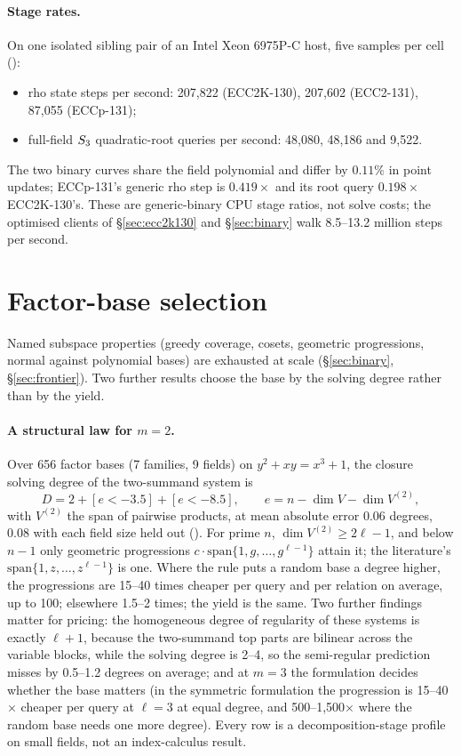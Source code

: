 \paragraph{Stage rates.} On one isolated sibling pair of an Intel Xeon
6975P-C host, five samples per cell
():
\begin{itemize}
\item rho state steps per second: 207{,}822 (ECC2K-130), 207{,}602
  (ECC2-131), 87{,}055 (ECCp-131);
\item full-field $S_{3}$ quadratic-root queries per second: 48{,}080,
  48{,}186 and 9{,}522.
\end{itemize}
The two binary curves share the field polynomial and differ by $0.11\%$ in
point updates; ECCp-131's generic rho step is $0.419\times$ and its root
query $0.198\times$ ECC2K-130's. These are generic-binary CPU stage ratios,
not solve costs; the optimised clients of \S\ref{sec:ecc2k130} and
\S\ref{sec:binary} walk 8.5--13.2 million steps per second.

\section{Factor-base selection}\label{sec:bt-fbselect}

Named subspace properties (greedy coverage, cosets, geometric progressions,
normal against polynomial bases) are exhausted at scale
(\S\ref{sec:binary}, \S\ref{sec:frontier}). Two further results choose the
base by the solving degree rather than by the yield.

\paragraph{A structural law for $m=2$.} Over 656 factor bases (7 families,
9 fields) on $y^2+xy=x^3+1$, the closure solving degree of the two-summand
system is
\[
D=2+[e<-3.5]+[e<-8.5],\qquad e=n-\dim V-\dim V^{(2)},
\]
with $V^{(2)}$ the span of pairwise products, at mean absolute error 0.06
degrees, 0.08 with each field size held out
(). For prime
$n$, $\dim V^{(2)}\ge2\ell-1$, and below $n-1$ only geometric progressions
$c\cdot\mathrm{span}\{1,g,\dots,g^{\ell-1}\}$ attain it; the literature's
$\mathrm{span}\{1,z,\dots,z^{\ell-1}\}$ is one. Where the rule puts a random
base a degree higher, the progressions are 15--40 times cheaper per query
and per relation on average, up to 100; elsewhere 1.5--2 times; the yield is
the same. Two further findings matter for pricing: the homogeneous degree of
regularity of these systems is exactly $\ell+1$, because the two-summand
top parts are bilinear across the variable blocks, while the solving degree
is 2--4, so the semi-regular prediction misses by 0.5--1.2 degrees on
average; and at $m=3$ the formulation decides whether the base matters (in
the symmetric formulation the progression is 15--40$\times$ cheaper per query
at $\ell=3$ at equal degree, and 500--1{,}500$\times$ where the random base
needs one more degree). Every row is a decomposition-stage profile on small
fields, not an index-calculus result.


